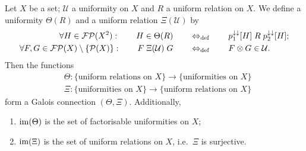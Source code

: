 \begin{proposition} \label{uniformRelationGaloisConnection}
Let $X$ be a set; $\mathcal{U}$ a uniformity on $X$ and $R$ a uniform relation on $X$. We define a uniformity $\Theta(R)$ and a uniform relation $\Xi(\mathcal{U})$ by
\begin{align*}
\forall H\in \operatorname{\mathcal{FP}}(X^2):\qquad H\in\Theta(R) \quad&\quad\Leftrightarrow_{\text{def}}\quad\quad p_1^{\downarrow\downarrow}[H]\mathrel{R}p_2^{\downarrow\downarrow}[H]; \\
\forall F,G\in\operatorname{\mathcal{FP}}(X)\setminus\{\operatorname{\mathcal{P}}(X)\}:\qquad F\mathrel{\Xi(\mathcal{U})}G \quad&\quad\Leftrightarrow_{\text{def}}\quad\quad F\otimes G\in \mathcal{U}. 
\end{align*}
Then the functions
\begin{align*}
&\Theta: \{\text{uniform relations on $X$}\} \to \{\text{uniformities on $X$}\} \\
&\Xi: \{\text{uniformities on $X$}\} \to \{\text{uniform relations on $X$}\}
\end{align*}
form a Galois connection $(\Theta, \Xi)$. Additionally,
\begin{enumerate}
\item $\operatorname{im}(\Theta)$ is the set of factorisable uniformities on $X$;
\item $\operatorname{im}(\Xi)$ is the set of uniform relations on $X$, i.e.\ $\Xi$ is surjective.
\end{enumerate}
\end{proposition}
